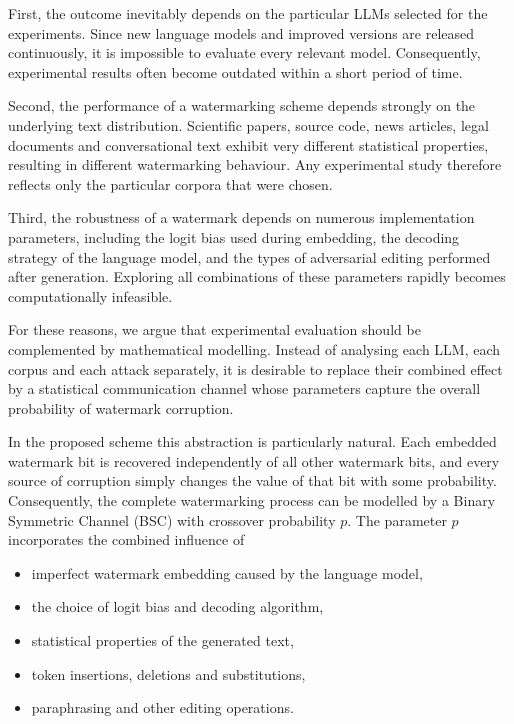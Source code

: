 \documentclass[a4paper,11pt]{llncs}
\begin{document}
First, the outcome inevitably depends on the particular LLMs selected for
the experiments. Since new language models and improved versions are
released continuously, it is impossible to evaluate every relevant model.
Consequently, experimental results often become outdated within a short
period of time.

Second, the performance of a watermarking scheme depends strongly on the
underlying text distribution. Scientific papers, source code, news
articles, legal documents and conversational text exhibit very different
statistical properties, resulting in different watermarking behaviour.
Any experimental study therefore reflects only the particular corpora that
were chosen.

Third, the robustness of a watermark depends on numerous implementation
parameters, including the logit bias used during embedding, the decoding
strategy of the language model, and the types of adversarial editing
performed after generation. Exploring all combinations of these
parameters rapidly becomes computationally infeasible.

For these reasons, we argue that experimental evaluation should be
complemented by mathematical modelling. Instead of analysing each LLM,
each corpus and each attack separately, it is desirable to replace their
combined effect by a statistical communication channel whose parameters
capture the overall probability of watermark corruption.

In the proposed scheme this abstraction is particularly natural.
Each embedded watermark bit is recovered independently of all other
watermark bits, and every source of corruption simply changes the value of
that bit with some probability. Consequently, the complete watermarking
process can be modelled by a Binary Symmetric Channel (BSC) with crossover
probability $p$. The parameter $p$ incorporates the combined influence of

\begin{itemize}
\item imperfect watermark embedding caused by the language model,
\item the choice of logit bias and decoding algorithm,
\item statistical properties of the generated text,
\item token insertions, deletions and substitutions,
\item paraphrasing and other editing operations.
\end{itemize}
\end{document}
